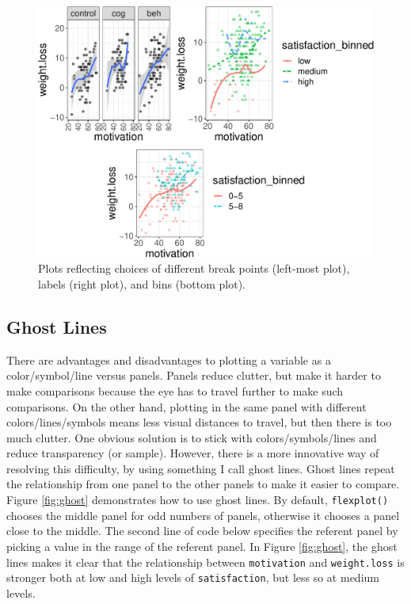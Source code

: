 \documentclass[
  doc]{apa6}
\begin{document}
\begin{figure}

{\centering \includegraphics[width=1\linewidth]{flexplot_psychmeth_files/figure-latex/panels2-1} 

}

\caption{Plots reflecting choices of different break points (left-most plot), labels (right plot), and bins (bottom plot). \label{fig:panels2}}\label{fig:panels2}
\end{figure}

\hypertarget{ghost-lines}{%
\subsection{Ghost Lines}\label{ghost-lines}}

There are advantages and disadvantages to plotting a variable as a color/symbol/line versus panels. Panels reduce clutter, but make it harder to make comparisons because the eye has to travel further to make such comparisons. On the other hand, plotting in the same panel with different colors/lines/symbols means less visual distances to travel, but then there is too much clutter. One obvious solution is to stick with colors/symbols/lines and reduce transparency (or sample). However, there is a more innovative way of resolving this difficulty, by using something I call ghost lines. Ghost lines repeat the relationship from one panel to the other panels to make it easier to compare. Figure \ref{fig:ghost} demonstrates how to use ghost lines. By default, \texttt{flexplot()} chooses the middle panel for odd numbers of panels, otherwise it chooses a panel close to the middle. The second line of code below specifies the referent panel by picking a value in the range of the referent panel. In Figure \ref{fig:ghost}, the ghost lines makes it clear that the relationship between \texttt{motivation} and \texttt{weight.loss} is stronger both at low and high levels of \texttt{satisfaction}, but less so at medium levels.
\end{document}
